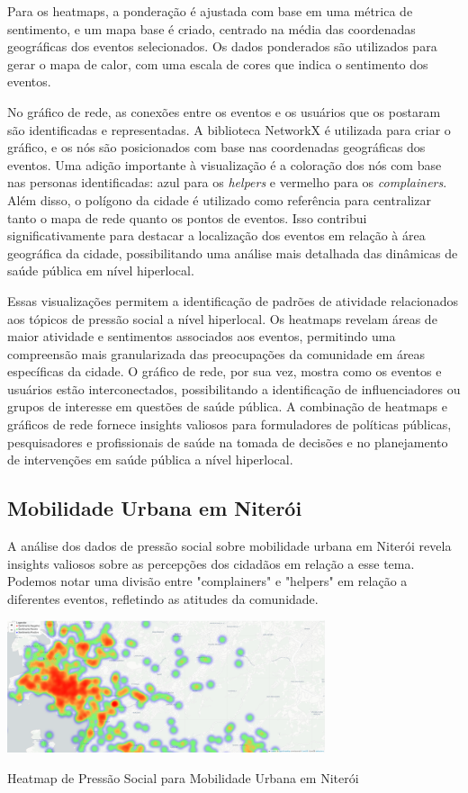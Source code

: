 Para os heatmaps, a ponderação é ajustada com base em uma métrica de sentimento, e um mapa base é criado, centrado na média das coordenadas geográficas dos eventos selecionados. Os dados ponderados são utilizados para gerar o mapa de calor, com uma escala de cores que indica o sentimento dos eventos.

No gráfico de rede, as conexões entre os eventos e os usuários que os postaram são identificadas e representadas. A biblioteca NetworkX é utilizada para criar o gráfico, e os nós são posicionados com base nas coordenadas geográficas dos eventos. Uma adição importante à visualização é a coloração dos nós com base nas personas identificadas: azul para os \textit{helpers}  e vermelho para os \textit{complainers}. Além disso, o polígono da cidade é utilizado como referência para centralizar tanto o mapa de rede quanto os pontos de eventos. Isso contribui significativamente para destacar a localização dos eventos em relação à área geográfica da cidade, possibilitando uma análise mais detalhada das dinâmicas de saúde pública em nível hiperlocal.

Essas visualizações permitem a identificação de padrões de atividade relacionados aos tópicos de pressão social a nível hiperlocal. Os heatmaps revelam áreas de maior atividade e sentimentos associados aos eventos, permitindo uma compreensão mais granularizada das preocupações da comunidade em áreas específicas da cidade. O gráfico de rede, por sua vez, mostra como os eventos e usuários estão interconectados, possibilitando a identificação de influenciadores ou grupos de interesse em questões de saúde pública. A combinação de heatmaps e gráficos de rede fornece insights valiosos para formuladores de políticas públicas, pesquisadores e profissionais de saúde na tomada de decisões e no planejamento de intervenções em saúde pública a nível hiperlocal.

\subsection{Mobilidade Urbana em Niterói}

A análise dos dados de pressão social sobre mobilidade urbana em Niterói revela insights valiosos sobre as percepções dos cidadãos em relação a esse tema. Podemos notar uma divisão entre "complainers" e "helpers" em relação a diferentes eventos, refletindo as atitudes da comunidade.

\begin{quadro}[htb]
	\centering
	\includegraphics[width=0.7\textwidth]{images/heatmap_niteroi.PNG}
	\caption{Heatmap de Pressão Social para Mobilidade Urbana em Niterói}
	\label{fig:heatmap_niteroi}
\end{quadro}

